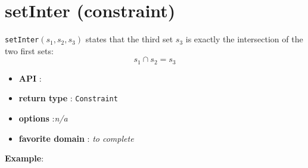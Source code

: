 \label{setinter}
\hypertarget{setinter}{}

\section{setInter (constraint)}\label{setinter:setinterconstraint}\hypertarget{setinter:setinterconstraint}{}
\begin{notedef}
  \texttt{setInter}$(s_1,s_2,s_3)$ states that the third set $s_3$ is exactly the intersection of the two first sets:
$$s_1\cap s_2=s_3$$
\end{notedef}

\begin{itemize}
	\item \textbf{API} : 
	\item \textbf{return type} : \texttt{Constraint}
	\item \textbf{options} :\emph{n/a}
	\item \textbf{favorite domain} : \emph{to complete}
\end{itemize}

\textbf{Example}:
